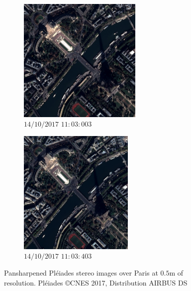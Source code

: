 \begin{figure}
    \centering
    \begin{subfigure}{0.5\linewidth}
        \centering
        \includegraphics[height=6cm]{Images/Chap_1/Paris_003.jpeg}
        \caption{$14/10/2017$ $11:03:003$}
        \label{fig:Pleiade_over_Paris_a}
    \end{subfigure}\hfill
    \begin{subfigure}{0.5\linewidth}
        \centering
        \includegraphics[height=6cm]{Images/Chap_1/Paris_403.jpeg}
        \caption{$14/10/2017$ $11:03:403$}
        \label{fig:Pleiade_over_Paris_b}
    \end{subfigure}
    \caption{Pansharpened Pléiades stereo images over Paris at $0.5$m of resolution. Pléiades \copyright CNES 2017, Distribution AIRBUS DS}
    \label{fig:Pleiade_over_Paris}
\end{figure}

